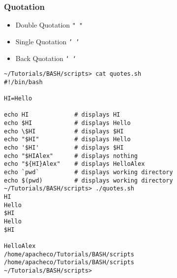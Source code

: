 \documentclass[slidestop,mathserif,compress,xcolor=svgnames]{beamer}
\begin{document}
\begin{frame}
  \frametitle{\small Quotation}
  \begin{itemize}
    \item Double Quotation \texttt{" "}
    \item Single Quotation \texttt{' '}
    \item Back Quotation \texttt{` `}
  \end{itemize}
  \tiny{
  \begin{verbatim}
~/Tutorials/BASH/scripts> cat quotes.sh 
#!/bin/bash

HI=Hello

echo HI             # displays HI
echo $HI            # displays Hello
echo \$HI           # displays $HI
echo "$HI"          # displays Hello
echo '$HI'          # displays $HI
echo "$HIAlex"      # displays nothing
echo "${HI}Alex"    # displays HelloAlex
echo `pwd`          # displays working directory
echo $(pwd)         # displays working directory
~/Tutorials/BASH/scripts> ./quotes.sh 
HI
Hello
$HI
Hello
$HI

HelloAlex
/home/apacheco/Tutorials/BASH/scripts
/home/apacheco/Tutorials/BASH/scripts
~/Tutorials/BASH/scripts>
  \end{verbatim}
  }
\end{frame}
\end{document}
